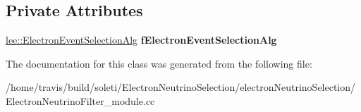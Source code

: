 \subsection*{Private Attributes}
\begin{DoxyCompactItemize}
\item 
\hypertarget{classlee_1_1ElectronNeutrinoFilter_a218cb05b2710a8cfaa9021cc7850bb28}{\hyperlink{classlee_1_1ElectronEventSelectionAlg}{lee\-::\-Electron\-Event\-Selection\-Alg} {\bfseries f\-Electron\-Event\-Selection\-Alg}}\label{classlee_1_1ElectronNeutrinoFilter_a218cb05b2710a8cfaa9021cc7850bb28}

\end{DoxyCompactItemize}


The documentation for this class was generated from the following file\-:\begin{DoxyCompactItemize}
\item 
/home/travis/build/soleti/\-Electron\-Neutrino\-Selection/electron\-Neutrino\-Selection/Electron\-Neutrino\-Filter\-\_\-module.\-cc\end{DoxyCompactItemize}
